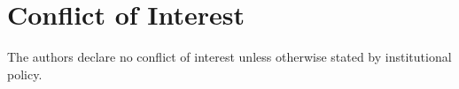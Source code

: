 \documentclass[11pt,a4paper]{article}
\begin{document}
\section*{Conflict of Interest}
The authors declare no conflict of interest unless otherwise stated by institutional policy.




\clearpage

\end{document}
